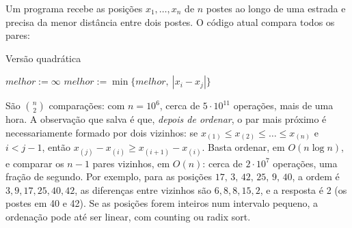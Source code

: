 \begin{exemplo}\label{ex:parproximo}
Um programa recebe as posições $x_1,\dots,x_n$ de $n$ postes ao longo de uma estrada e precisa da menor distância entre dois postes. O código atual compara todos os pares:
\begin{pseudo}{Versão quadrática}
\begin{algorithmic}
\State $melhor:=\infty$
  \State $melhor:=\min\{melhor,\ |x_i-x_j|\}$ \EndFor \EndFor
\end{algorithmic}
\end{pseudo}
São $\binom n2$ comparações: com $n=10^6$, cerca de $5\cdot10^{11}$ operações, mais de uma hora. A observação que salva é que, \emph{depois de ordenar}, o par mais próximo é necessariamente formado por dois vizinhos: se $x_{(1)}\le x_{(2)}\le\dots\le x_{(n)}$ e $i<j-1$, então $x_{(j)}-x_{(i)}\ge x_{(i+1)}-x_{(i)}$. Basta ordenar, em $O(n\log n)$, e comparar os $n-1$ pares vizinhos, em $O(n)$: cerca de $2\cdot10^7$ operações, uma fração de segundo. Por exemplo, para as posições $17,\,3,\,42,\,25,\,9,\,40$, a ordem é $3,9,17,25,40,42$, as diferenças entre vizinhos são $6,8,8,15,2$, e a resposta é 2 (os postes em 40 e 42). Se as posições forem inteiros num intervalo pequeno, a ordenação pode até ser linear, com counting ou radix sort.
\end{exemplo}

